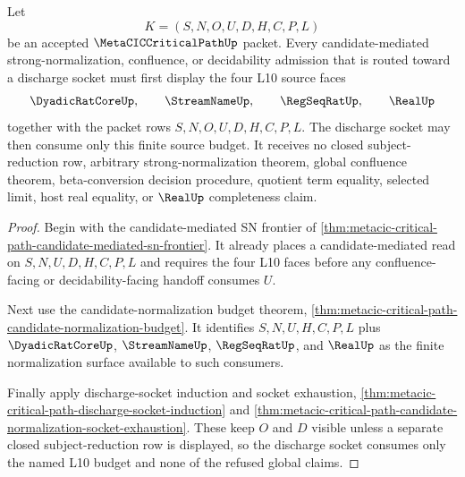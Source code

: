 \begin{theorem}
\label{thm:metaciccriticalpath-l10-normalization-discharge-budget}
Let
$$
K=(S,N,O,U,D,H,C,P,L)
$$
be an accepted $\MetaCICCriticalPathUp$ packet. Every candidate-mediated strong-normalization, confluence, or decidability admission that is routed toward a discharge socket must first display the four L10 source faces
$$
\DyadicRatCoreUp,\qquad
\StreamNameUp,\qquad
\RegSeqRatUp,\qquad
\RealUp
$$
together with the packet rows $S,N,O,U,D,H,C,P,L$. The discharge socket may then consume only this finite source budget. It receives no closed subject-reduction row, arbitrary strong-normalization theorem, global confluence theorem, beta-conversion decision procedure, quotient term equality, selected limit, host real equality, or $\RealUp$ completeness claim.
\end{theorem}
\begin{proof}
Begin with the candidate-mediated SN frontier of \autoref{thm:metacic-critical-path-candidate-mediated-sn-frontier}. It already places a candidate-mediated read on $S,N,U,D,H,C,P,L$ and requires the four L10 faces before any confluence-facing or decidability-facing handoff consumes $U$.

Next use the candidate-normalization budget theorem, \autoref{thm:metacic-critical-path-candidate-normalization-budget}. It identifies $S,N,U,H,C,P,L$ plus $\DyadicRatCoreUp$, $\StreamNameUp$, $\RegSeqRatUp$, and $\RealUp$ as the finite normalization surface available to such consumers.

Finally apply discharge-socket induction and socket exhaustion, \autoref{thm:metacic-critical-path-discharge-socket-induction} and \autoref{thm:metacic-critical-path-candidate-normalization-socket-exhaustion}. These keep $O$ and $D$ visible unless a separate closed subject-reduction row is displayed, so the discharge socket consumes only the named L10 budget and none of the refused global claims.
\end{proof}

